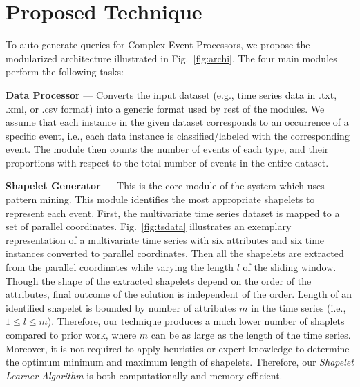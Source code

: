 \documentclass[conference]{IEEEtran}  %
\begin{document}
\section{Proposed Technique}
To auto generate queries for Complex Event Processors, we propose the modularized architecture illustrated in Fig.~\ref{fig:archi}. The four main modules perform the following tasks:

\textbf{Data Processor} --- Converts the input dataset (e.g., time series data in .txt, .xml, or .csv format) into a generic format used by rest of the modules. We assume that each instance in the given dataset corresponds to an occurrence of a specific event, i.e., each data instance is classified/labeled with the corresponding event. The module then counts the number of events of each type, and their proportions with respect to the total number of events in the entire dataset.

\textbf{Shapelet Generator}	--- This is the core module of the system which uses pattern mining. This module identifies the most appropriate shapelets to represent each event. First, the multivariate time series dataset is mapped to a set of parallel coordinates. Fig.~\ref{fig:tsdata} illustrates an exemplary representation of a multivariate time series with six attributes and six time instances converted to parallel coordinates. Then all the shapelets are extracted from the parallel coordinates while varying the length $l$ of the sliding window. Though the shape of the extracted shapelets depend on the order of the attributes, final outcome of the solution is independent of the order. Length of an identified shapelet is bounded by number of attributes $m$ in the time series (i.e., $1 \leq l \leq m$). Therefore, our technique produces a much lower number of shaplets compared to prior work, where $m$ can be as large as the length of the time series. Moreover, it is not required to apply heuristics or expert knowledge to determine the optimum minimum and maximum length of shapelets. Therefore, our \textit{Shapelet Learner Algorithm} is both computationally and memory efficient.
\end{document}
